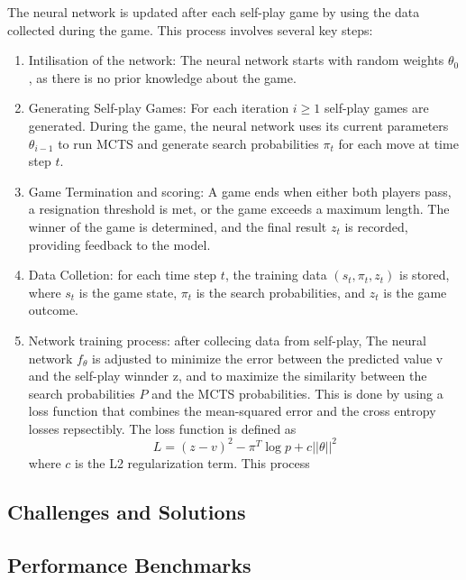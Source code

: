 The neural network is updated after each self-play game by using the data collected during the game. This process involves several key steps:
\begin{enumerate}
    \item Intilisation of the network: The neural network starts with random weights $\theta_0$, as there is no prior knowledge about the game.
    \item Generating Self-play Games: For each iteration $i \geq 1$ self-play games are generated. During the game, the neural network uses its current parameters $\theta_{i - 1}$ to run MCTS and generate search probabilities $\pi_t$ for each move at time step $t$.
    \item Game Termination and scoring: A game ends when either both players pass, a resignation threshold is met, or the game exceeds a maximum length. The winner of the game is determined, and the final result $z_t$ is recorded, providing feedback to the model.
    \item Data Colletion: for each time step $t$, the training data $(s_t, \pi_t, z_t)$ is stored, where $s_t$ is the game state, $\pi_t$ is the search probabilities, and $z_t$ is the game outcome.
    \item Network training process: after collecing data from self-play, The neural network $f_\theta$ is adjusted to minimize the error between the predicted value v and the self-play winnder z, and to maximize the similarity between the search probabilities $P$ and the MCTS probabilities.
    This is done by using a loss function that combines the mean-squared error and the cross entropy losses repsectibly. The loss function is defined as \[ L = (z - v)^2 - \pi^T \log p + c||\theta||^2\] where $c$ is the L2 regularization term.
    This process 

\end{enumerate}

\subsection{Challenges and Solutions}

\subsection{Performance Benchmarks}


